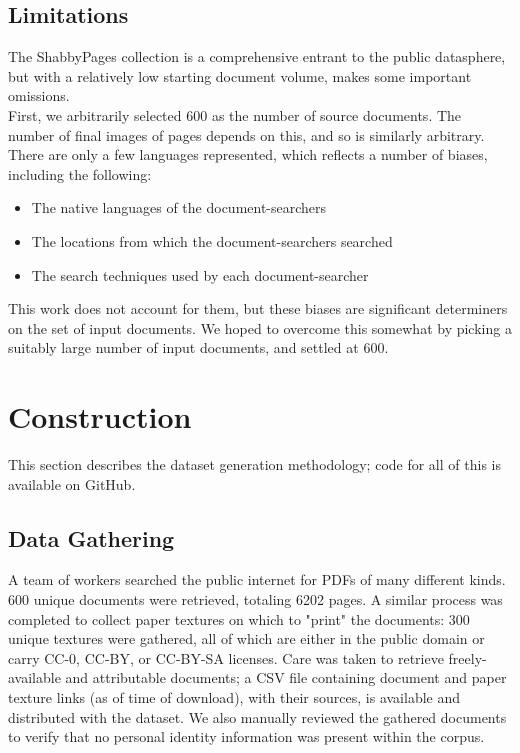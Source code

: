 \documentclass[runningheads]{llncs}
\begin{document}
\subsection{Limitations}
The ShabbyPages collection is a comprehensive entrant to the public datasphere, but with a relatively low starting document volume, makes some important omissions.\\

First, we arbitrarily selected 600 as the number of source documents. The number of final images of pages depends on this, and so is similarly arbitrary.\\

There are only a few languages represented, which reflects a number of biases, including the following:
\begin{itemize}
\item The native languages of the document-searchers
\item The locations from which the document-searchers searched
\item The search techniques used by each document-searcher
\end{itemize}

This work does not account for them, but these biases are significant determiners on the set of input documents. We hoped to overcome this somewhat by picking a suitably large number of input documents, and settled at 600.

\section{Construction}
This section describes the dataset generation methodology; code for all of this is available on GitHub.

\subsection{Data Gathering}
A team of workers searched the public internet for PDFs of many different kinds. 600 unique documents were retrieved, totaling 6202 pages. A similar process was completed to collect paper textures on which to "print" the documents: 300 unique textures were gathered, all of which are either in the public domain or carry CC-0, CC-BY, or CC-BY-SA licenses. Care was taken to retrieve freely-available and attributable documents; a CSV file containing document and paper texture links (as of time of download), with their sources, is available and distributed with the dataset. We also manually reviewed the gathered documents to verify that no personal identity information was present within the corpus.
\end{document}
